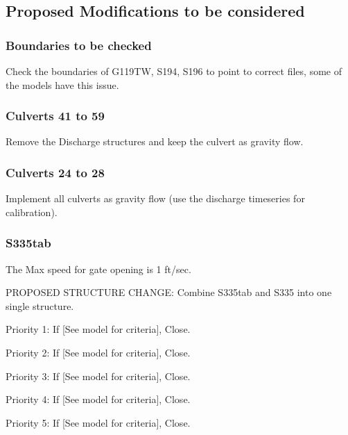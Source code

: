 \clearpage
\subsection{Proposed Modifications to be considered}

\subsubsection{Boundaries to be checked}

Check the boundaries of G119TW, S194, S196 to point to correct files, some of the models have this issue.


\subsubsection{Culverts 41 to 59}

Remove the Discharge structures and keep the culvert as gravity flow.

\subsubsection{Culverts 24 to 28}

Implement all culverts as gravity flow (use the discharge timeseries for calibration).

\subsubsection{S335tab}

The Max speed for gate opening is 1 ft/sec.

PROPOSED STRUCTURE CHANGE: Combine S335tab and S335 into one single structure.

\begin{packed_items}
\item Priority 1: If \textcolor[rgb]{1.00,0.00,0.00}{[See model for criteria]}, Close.
\item Priority 2: If \textcolor[rgb]{1.00,0.00,0.00}{[See model for criteria]}, Close.
\item Priority 3: If \textcolor[rgb]{1.00,0.00,0.00}{[See model for criteria]}, Close.
\item Priority 4: If \textcolor[rgb]{1.00,0.00,0.00}{[See model for criteria]}, Close.
\item Priority 5: If \textcolor[rgb]{1.00,0.00,0.00}{[See model for criteria]}, Close.
\end{packed_items}


